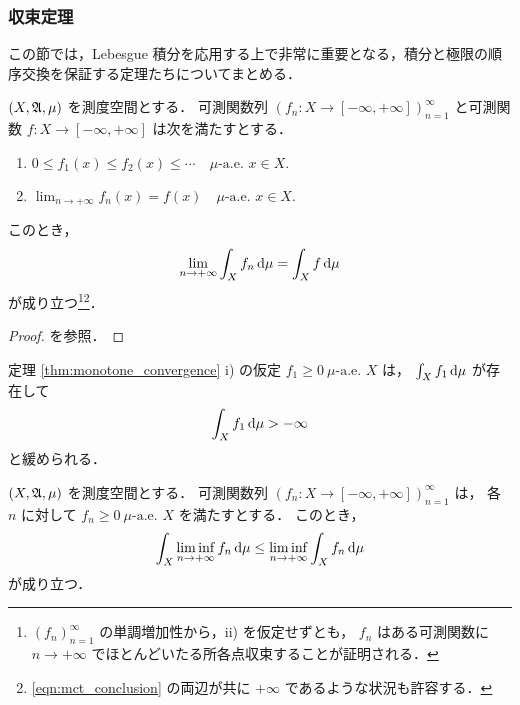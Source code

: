 \subsubsection{収束定理}

この節では，Lebesgue 積分を応用する上で非常に重要となる，積分と極限の順序交換を保証する定理たちについてまとめる．

\begin{theorem}[単調収束定理]\label{thm:monotone_convergence}
    $(X,\mathfrak{A},\mu)$ を測度空間とする．
    可測関数列 $(f_n:X\to[-\infty,+\infty])_{n=1}^\infty$ と可測関数 $f:X\to[-\infty,+\infty]$ は次を満たすとする．
    \begin{enumerate}
        \item $0\le f_1(x)\le f_2(x)\le\cdots\quad\text{$\mu$-a.e.\ $x\in X$}.$
        \item $\displaystyle\lim_{n\to+\infty}f_n(x)=f(x)\quad\text{$\mu$-a.e.\ $x\in X$}$.
    \end{enumerate}
    このとき，
    \begin{align}
        \lim_{n\to+\infty}\int_Xf_n\,\mathrm{d}\mu=\int_Xf\,\mathrm{d}\mu
        \label{eqn:mct_conclusion}
    \end{align}
    が成り立つ\footnote{
        $(f_n)_{n=1}^\infty$ の単調増加性から，\textrm{ii)} を仮定せずとも，
        $f_n$ はある可測関数に $n\to+\infty$ でほとんどいたる所各点収束することが証明される．
    }\footnote{\eqref{eqn:mct_conclusion} の両辺が共に $+\infty$ であるような状況も許容する．}．
\end{theorem}

\begin{proof}
    \cite[定理 13.2]{It63} を参照．
\end{proof}

\begin{remark}
    定理 \ref{thm:monotone_convergence} \textrm{i)} の仮定 $f_1\ge0\ \text{$\mu$-a.e.\ $X$}$ は，
    $\int_Xf_1\,\mathrm{d}\mu$ が存在して
    \begin{align*}
        \int_Xf_1\,\mathrm{d}\mu>-\infty
    \end{align*}
    と緩められる．
\end{remark}

\begin{lemma}\label{lem:Fatou}
    $(X,\mathfrak{A},\mu)$ を測度空間とする．
    可測関数列 $(f_n:X\to[-\infty,+\infty])_{n=1}^\infty$ は，
    各 $n$ に対して $f_n\ge0\ \text{$\mu$-a.e.\ $X$}$ を満たすとする．
    このとき，
    \begin{align*}
        \int_X\liminf_{n\to+\infty}f_n\,\mathrm{d}\mu\le\liminf_{n\to+\infty}\int_Xf_n\,\mathrm{d}\mu
    \end{align*}
    が成り立つ．
\end{lemma}

